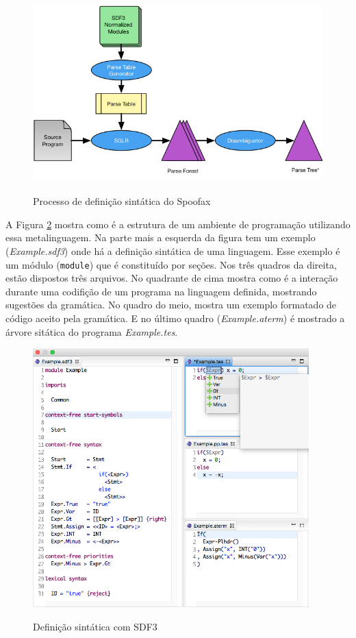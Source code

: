 \begin{figure}[h]
\centering
\caption{Processo de definição sintática do Spoofax}
\includegraphics[height=7cm]{figuras/parsing.png}
\label{fig:parsing}
\end{figure}

A Figura \ref{fig:sdf} mostra como é a estrutura de um ambiente de programação utilizando essa metalinguagem. Na parte mais a esquerda da figura tem um exemplo (\textit{Example.sdf3}) onde há a definição sintática de uma linguagem. Esse exemplo é um módulo (\texttt{module}) que é constituído por seções. Nos três quadros da direita, estão dispostos três arquivos. No quadrante de cima mostra como é a interação durante uma codifição de um programa na linguagem definida, mostrando sugestões da gramática. No quadro do meio, mostra um exemplo formatado de código aceito pela gramática. E no último quadro (\textit{Example.aterm}) é mostrado a árvore sitática do programa \textit{Example.tes}.

\begin{figure}[h]
\centering
\caption{Definição sintática com SDF3}
\includegraphics[height=10cm]{figuras/sdf3-spoofax.png}
\label{fig:sdf}
\end{figure}


